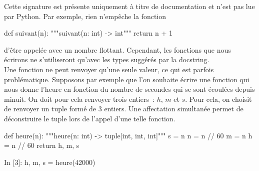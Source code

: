 \documentclass{magnoliaold}
\begin{document}
\noindent
Cette signature est présente uniquement à titre de documentation et
n'est pas lue par Python. Par exemple, rien n'empêche la fonction
\begin{pythoncodeline}
def suivant(n):
    """suivant(n: int) -> int"""
    return n + 1
\end{pythoncodeline}
d'être appelée avec un nombre flottant. Cependant, les fonctions que nous écrirons ne s'utiliseront
qu'avec les types suggérés par la docstring.\\

Une fonction ne peut renvoyer qu'une seule valeur, ce qui est parfois problématique.
Supposons par exemple que l'on souhaite écrire une fonction qui nous donne l'heure en 
fonction du nombre de secondes qui se sont écoulées depuis minuit. On doit pour cela renvoyer
trois entiers~: $h$, $m$ et $s$. Pour cela, on choisit de renvoyer un tuple
formé de 3 entiers. Une affectation simultanée permet de déconstruire le tuple lors de
l'appel d'une telle fonction.

\begin{pythoncodeline}
def heure(n):
    """heure(n: int) -> tuple[int, int, int]"""
    s = n %
    n = n // 60
    m = n %
    h = n // 60
    return h, m, s  
\end{pythoncodeline}

\begin{pythoncode}
In [3]: h, m, s = heure(42000)
\end{pythoncode}

				
\end{document}
